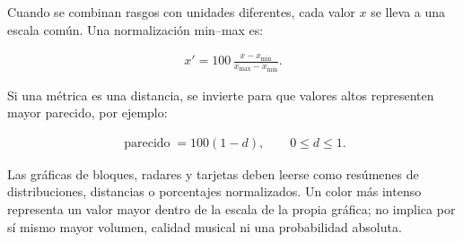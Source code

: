 \documentclass[11pt, a4paper]{article}
\begin{document}
Cuando se combinan rasgos con unidades diferentes, cada valor $x$ se lleva a una escala común. Una normalización min--max es:

\begin{align}
x'=100\,\frac{x-x_{\min}}{x_{\max}-x_{\min}}.
\end{align}

Si una métrica es una distancia, se invierte para que valores altos representen mayor parecido, por ejemplo:

\begin{align}
\operatorname{parecido}=100(1-d), \qquad 0\leq d\leq1.
\end{align}

Las gráficas de bloques, radares y tarjetas deben leerse como resúmenes de distribuciones, distancias o porcentajes normalizados. Un color más intenso representa un valor mayor dentro de la escala de la propia gráfica; no implica por sí mismo mayor volumen, calidad musical ni una probabilidad absoluta.
\end{document}
